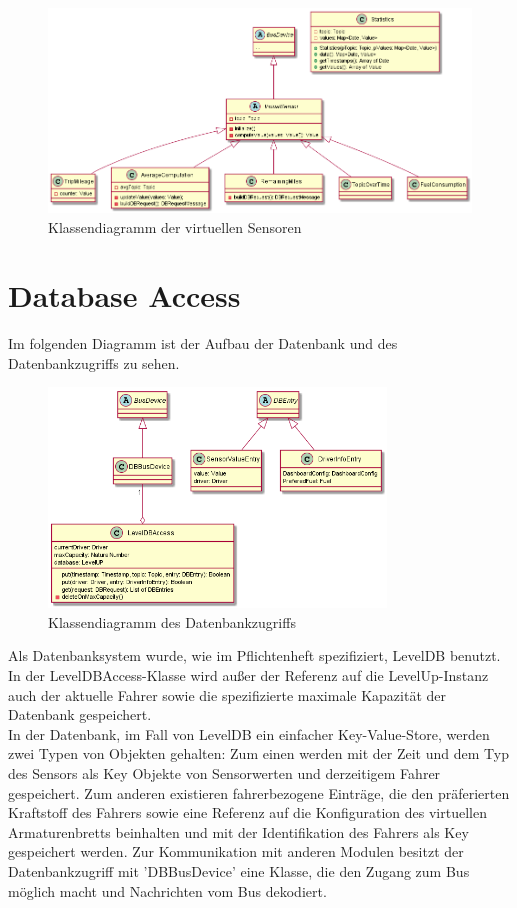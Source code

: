 \documentclass[entwurf.tex]{subfiles}
\begin{document}
		\begin{figure}[H]
  			\begin{center}
 				\includegraphics[width=0.8\textheight,angle=90]{diagrams/VirtualSensors.png}
  				\caption{Klassendiagramm der virtuellen Sensoren}
  			\end{center}
  		\end{figure}
  	\newpage
  	\section{Database Access}
  		Im folgenden Diagramm ist der Aufbau der Datenbank und des Datenbankzugriffs zu sehen.
  		\begin{figure}[H]
  			\begin{center}
 				\includegraphics[width=0.8\textwidth]{diagrams/DBAccess.png}
  				\caption{Klassendiagramm des Datenbankzugriffs}
  			\end{center}
  		\end{figure}
  	Als Datenbanksystem wurde, wie im Pflichtenheft spezifiziert, LevelDB benutzt. In der LevelDBAccess-Klasse wird außer der Referenz auf die LevelUp-Instanz auch der aktuelle Fahrer sowie die spezifizierte maximale Kapazität der Datenbank gespeichert. \\ In der Datenbank, im Fall von LevelDB ein einfacher Key-Value-Store, werden zwei Typen von Objekten gehalten: Zum einen werden mit der Zeit und dem Typ des Sensors als Key Objekte von Sensorwerten und derzeitigem Fahrer gespeichert. Zum anderen existieren fahrerbezogene Einträge, die den präferierten Kraftstoff des Fahrers sowie eine Referenz auf die Konfiguration des virtuellen Armaturenbretts beinhalten und mit der Identifikation des Fahrers als Key gespeichert werden. Zur Kommunikation mit anderen Modulen besitzt der Datenbankzugriff mit 'DBBusDevice' eine Klasse, die den Zugang zum Bus möglich macht und Nachrichten vom Bus dekodiert. 
  	
\end{document}
